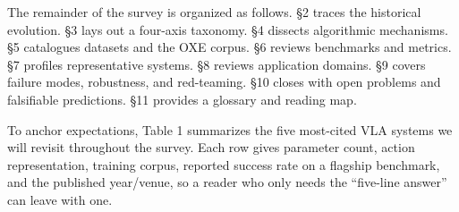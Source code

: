 The remainder of the survey is organized as follows. §2 traces the historical evolution. §3 lays out a four-axis taxonomy. §4 dissects algorithmic mechanisms. §5 catalogues datasets and the OXE corpus. §6 reviews benchmarks and metrics. §7 profiles representative systems. §8 reviews application domains. §9 covers failure modes, robustness, and red-teaming. §10 closes with open problems and falsifiable predictions. §11 provides a glossary and reading map.

To anchor expectations, Table 1 summarizes the five most-cited VLA systems we will revisit throughout the survey. Each row gives parameter count, action representation, training corpus, reported success rate on a flagship benchmark, and the published year/venue, so a reader who only needs the ``five-line answer'' can leave with one.

